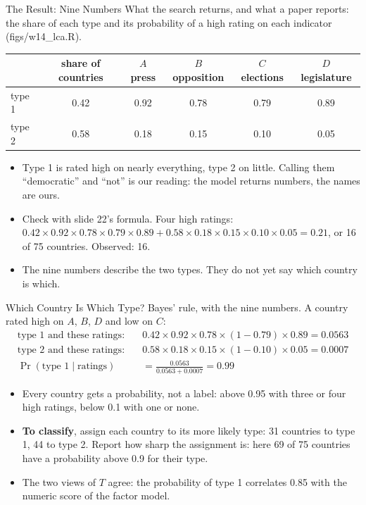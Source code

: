 \documentclass[aspectratio=169,11pt,xcolor=dvipsnames]{beamer}
\newcommand{\srcp}[1]{{\scriptsize\color{gray}(#1)}}
\begin{document}
\begin{frame}{The Result: Nine Numbers}
What the search returns, and what a paper reports: the share of each type and its probability
of a high rating on each indicator \srcp{figs/w14\_lca.R}.
\begin{center}\small
\renewcommand{\arraystretch}{1.15}
\begin{tabular}{@{}lccccc@{}}
\toprule
 & share of countries & $A$ press & $B$ opposition & $C$ elections & $D$ legislature \\
\midrule
type 1 & 0.42 & 0.92 & 0.78 & 0.79 & 0.89 \\
type 2 & 0.58 & 0.18 & 0.15 & 0.10 & 0.05 \\
\bottomrule
\end{tabular}
\end{center}
\begin{itemize}\itemsep5pt
  \item Type 1 is rated high on nearly everything, type 2 on little. Calling them ``democratic''
        and ``not'' is our reading: the model returns numbers, the names are ours.
  \item Check with slide 22's formula. Four high ratings:
        $0.42 \times 0.92 \times 0.78 \times 0.79 \times 0.89
        + 0.58 \times 0.18 \times 0.15 \times 0.10 \times 0.05 = 0.21$, or 16 of 75 countries.
        Observed: 16.
  \item The nine numbers describe the two types. They do not yet say which country is which.
\end{itemize}
\end{frame}

\begin{frame}{Which Country Is Which Type?}
Bayes' rule, with the nine numbers. A country rated high on $A$, $B$, $D$ and low on $C$:
\begin{align*}
  \text{type 1 and these ratings:} \quad & 0.42 \times 0.92 \times 0.78 \times (1 - 0.79) \times 0.89 = 0.0563 \\
  \text{type 2 and these ratings:} \quad & 0.58 \times 0.18 \times 0.15 \times (1 - 0.10) \times 0.05 = 0.0007 \\
  \Pr(\text{type 1} \mid \text{ratings}) &= \frac{0.0563}{0.0563 + 0.0007} = 0.99
\end{align*}
\vskip-4pt
\begin{itemize}\itemsep4pt
  \item Every country gets a probability, not a label: above 0.95 with three or four high
        ratings, below 0.1 with one or none.
  \item \textbf{To classify}, assign each country to its more likely type: 31 countries to type 1,
        44 to type 2. Report how sharp the assignment is: here 69 of 75 countries have a
        probability above 0.9 for their type.
  \item The two views of $T$ agree: the probability of type 1 correlates 0.85 with the numeric
        score of the factor model.
\end{itemize}
\end{frame}
\end{document}

